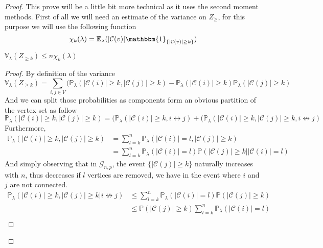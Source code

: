 \begin{proof}
	This prove will be a little bit more technical as it uses the second moment methods.
	First of all we will need an estimate of the variance on $Z_{\geq}$, for this purpose we will use the following function
	\begin{equation}
		\chi_k(\lambda) = \mathbb{E}_{\lambda}(|\mathcal{C}(v)|\mathbbm{1}_{\{|\mathcal{C}(v)| \geq k\}})
	\end{equation}
	\begin{lemma}
		$\mathbb{V}_{\lambda}(Z_{\geq k}) \leq n\chi_k(\lambda)$
	\end{lemma}
	\begin{proof}
		By definition of the variance
		\begin{equation}
			\mathbb{V}_{\lambda}(Z_{\geq k}) = \sum_{i,j \in V}(\mathbb{P}_{\lambda}(|\mathcal{C}(i)| \geq k, |\mathcal{C}(j)| \geq k)
				-\mathbb{P}_{\lambda}(|\mathcal{C}(i)| \geq k)\mathbb{P}_{\lambda}(|\mathcal{C}(j)| \geq k)
		\end{equation}
		And we can split those probabilities as components form an obvious partition of the vertex set as follow
		\begin{equation}
			\mathbb{P}_{\lambda}(|\mathcal{C}(i)| \geq k, |\mathcal{C}(j)| \geq k) 
			= (\mathbb{P}_{\lambda}(|\mathcal{C}(i)| \geq k, i \leftrightarrow j) 
			+ (\mathbb{P}_{\lambda}(|\mathcal{C}(i)| \geq k, |\mathcal{C}(j)| \geq k, i \not\leftrightarrow j)
		\end{equation}
		Furthermore, 
		\begin{align}
			\mathbb{P}_{\lambda}(|\mathcal{C}(i)| \geq k, |\mathcal{C}(j)| \geq k) 
			&= \sum_{l=k}^{n} \mathbb{P}_{\lambda}(|\mathcal{C}(i)| = l, |\mathcal{C}(j)| \geq k) \\
			&= \sum_{l=k}^{n} \mathbb{P}_{\lambda}(|\mathcal{C}(i)| = l)\mathbb{P}( |\mathcal{C}(j)| \geq k | |\mathcal{C}(i)| = l) 
		\end{align}
		And simply observing that in $\mathcal{G}_{n,p}$, the event $\{|\mathcal{C}(j)| \geq k\}$ naturally increases with $n$, thus decreases if $l$ vertices are removed, we have in the event where $i$ and $j$ are not connected.
		\begin{align}\label{negval}
			\mathbb{P}_{\lambda}(|\mathcal{C}(i)| \geq k, |\mathcal{C}(j)| \geq k | i \not\leftrightarrow j) 
			&\leq \sum_{l=k}^{n} \mathbb{P}_{\lambda}(|\mathcal{C}(i)| = l)\mathbb{P}( |\mathcal{C}(j)| \geq k ) \\
			&\leq \mathbb{P}( |\mathcal{C}(j)| \geq k ) \sum_{l=k}^{n} \mathbb{P}_{\lambda}(|\mathcal{C}(i)| = l) \\

\end{align}
\end{proof}
\end{proof}
